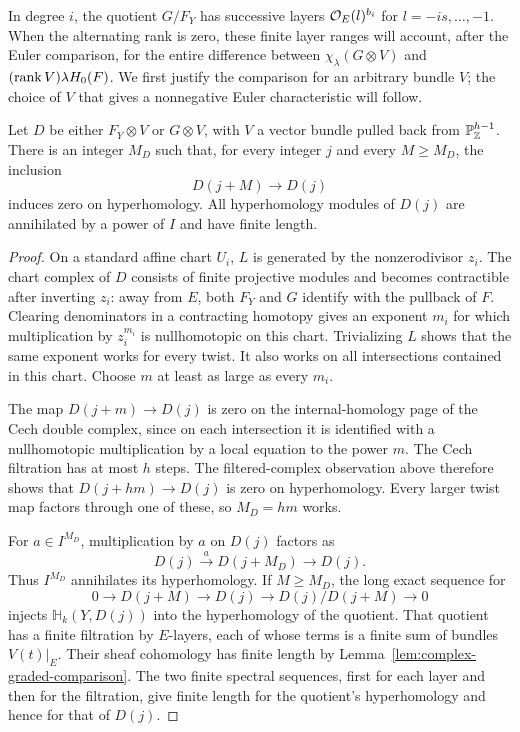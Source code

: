 In degree $i$, the quotient $G/F_Y$ has successive layers
$\mathcal O_E(l)^{b_i}$ for $l=-is,\ldots,-1$. When the alternating rank is
zero, these finite layer ranges will account, after the Euler comparison,
for the entire difference between $\chi_\lambda(G\otimes V)$ and
$(\operatorname{rank} V)\lambda H_0(F)$. We first justify the comparison for an
arbitrary bundle $V$; the choice of $V$ that gives a nonnegative Euler
characteristic will follow.

\begin{lemma}\label{lem:complex-twist-maps}
Let $D$ be either $F_Y\otimes V$ or $G\otimes V$, with $V$ a vector
bundle pulled back from $\mathbb P_\mathbb Z^{h-1}$. There is an integer $M_D$ such
that, for every integer $j$ and every $M\geq M_D$, the inclusion
\[
 D(j+M)\longrightarrow D(j)
\]
induces zero on hyperhomology. All hyperhomology modules of $D(j)$ are
annihilated by a power of $I$ and have finite length.
\end{lemma}
\begin{proof}
On a standard affine chart $U_i$, $L$ is generated by the nonzerodivisor
$z_i$. The chart complex of $D$ consists of finite projective modules and
becomes contractible after inverting $z_i$: away from $E$, both $F_Y$ and
$G$ identify with the pullback of $F$. Clearing denominators in a
contracting homotopy gives an exponent $m_i$ for which multiplication by
$z_i^{m_i}$ is nullhomotopic on this chart. Trivializing $L$ shows that the
same exponent works for every twist. It also works on all intersections
contained in this chart. Choose $m$ at least as large as every $m_i$.

The map $D(j+m)\to D(j)$ is zero on the internal-homology page of the
Cech double complex, since on each intersection it is identified with a
nullhomotopic multiplication by a local equation to the power $m$.
The Cech filtration has at most $h$ steps. The filtered-complex observation
above therefore shows that $D(j+hm)\to D(j)$ is zero on hyperhomology.
Every larger twist map factors through one of these, so $M_D=hm$ works.

For $a\in I^{M_D}$, multiplication by $a$ on $D(j)$ factors as
\[
 D(j)\xrightarrow{a}D(j+M_D)\longrightarrow D(j).
\]
Thus $I^{M_D}$ annihilates its hyperhomology. If $M\geq M_D$, the long
exact sequence for
\[
 0\longrightarrow D(j+M)\longrightarrow D(j)
 \longrightarrow D(j)/D(j+M)\longrightarrow0
\]
injects $\mathbb H_k(Y,D(j))$ into the hyperhomology of the quotient.
That quotient has a finite filtration by $E$-layers, each of whose terms
is a finite sum of bundles $V(t)|_E$. Their sheaf cohomology has finite
length by Lemma~\ref{lem:complex-graded-comparison}. The two finite
spectral sequences, first for each layer and then for the filtration,
give finite length for the quotient's hyperhomology and hence for that
of $D(j)$.
\end{proof}

